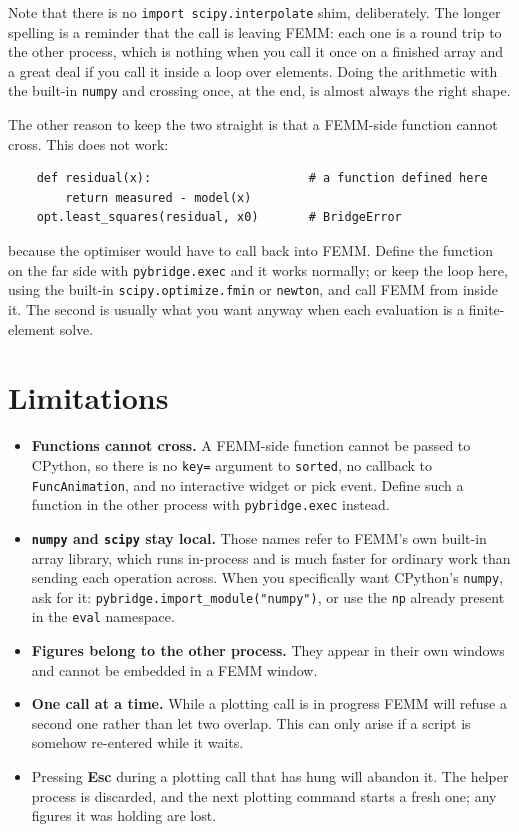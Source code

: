 Note that there is no {\tt import scipy.interpolate} shim, deliberately.  The
longer spelling is a reminder that the call is leaving FEMM: each one is a
round trip to the other process, which is nothing when you call it once on a
finished array and a great deal if you call it inside a loop over elements.
Doing the arithmetic with the built-in {\tt numpy} and crossing once, at the
end, is almost always the right shape.

The other reason to keep the two straight is that a FEMM-side function cannot
cross.  This does not work:

\begin{verbatim}
    def residual(x):                      # a function defined here
        return measured - model(x)
    opt.least_squares(residual, x0)       # BridgeError
\end{verbatim}

\noindent because the optimiser would have to call back into FEMM.  Define the
function on the far side with {\tt pybridge.exec} and it works normally; or
keep the loop here, using the built-in {\tt scipy.optimize.fmin} or
{\tt newton}, and call FEMM from inside it.  The second is usually what you
want anyway when each evaluation is a finite-element solve.

\section{Limitations}

\begin{itemize}
\item{\bf Functions cannot cross.}  A FEMM-side function cannot be passed to
CPython, so there is no {\tt key=} argument to {\tt sorted}, no callback to
{\tt FuncAnimation}, and no interactive widget or pick event.  Define such a
function in the other process with {\tt pybridge.exec} instead.

\item{\bf {\tt numpy} and {\tt scipy} stay local.}  Those names refer to
FEMM's own built-in array library, which runs in-process and is much faster
for ordinary work than sending each operation across.  When you specifically
want CPython's {\tt numpy}, ask for it: {\tt pybridge.import\_module("numpy")},
or use the {\tt np} already present in the {\tt eval} namespace.

\item{\bf Figures belong to the other process.}  They appear in their own
windows and cannot be embedded in a FEMM window.

\item{\bf One call at a time.}  While a plotting call is in progress FEMM will
refuse a second one rather than let two overlap.  This can only arise if a
script is somehow re-entered while it waits.

\item Pressing {\bf Esc} during a plotting call that has hung will abandon it.
The helper process is discarded, and the next plotting command starts a fresh
one; any figures it was holding are lost.
\end{itemize}
